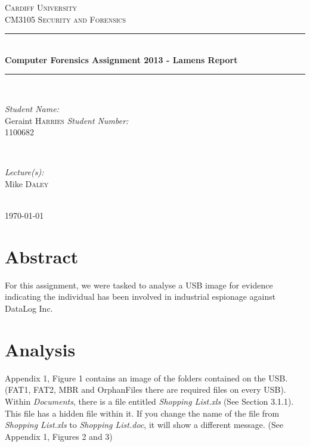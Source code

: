 \documentclass[12pt]{article}
\begin{document}
		\begin{titlepage}
			
			\newcommand{\HRule}{\rule{\linewidth}{0.5mm}}
			\center

			\textsc{\LARGE Cardiff University}\\[1.5cm]
			\textsc{\Large CM3105 Security and Forensics}\\[0.5mm]

			\HRule \\[0.4mm]
				{\huge \bfseries Computer Forensics Assignment 2013 - Lamens Report}\\[0.4cm]
			\HRule \\[1.5cm]

			\begin{minipage}{0.4\textwidth}
				\begin{flushleft} \large
					\emph{Student Name:}\\
						Geraint \textsc{Harries} \newline
					\emph{Student Number:}\\
						1100682
				\end{flushleft}
			\end{minipage}
			~
			\begin{minipage}{0.4\textwidth}
				\begin{flushright} \large
					\emph{Lecture(s):}\\
						Mike \textsc{Daley}
				\end{flushright}
			\end{minipage}\\[4cm]

			{\large \today}\\[3cm]

			\vfill

		\end{titlepage}

		\section{Abstract}

			For this assignment, we were tasked to analyse a USB image for evidence indicating the individual has been involved in industrial espionage against DataLog Inc.
			
		\section{Analysis}

			Appendix 1, Figure 1 contains an image of the folders contained on the USB. (FAT1, FAT2, MBR and OrphanFiles there are required files on every USB). Within \textit{Documents}, there is a file entitled \textit{Shopping List.xls} (See Section 3.1.1). This file has a hidden file within it. If you change the name of the file from \textit{Shopping List.xls} to \textit{Shopping List.doc}, it will show a different message. (See Appendix 1, Figures 2 and 3)\newline
\end{document}
